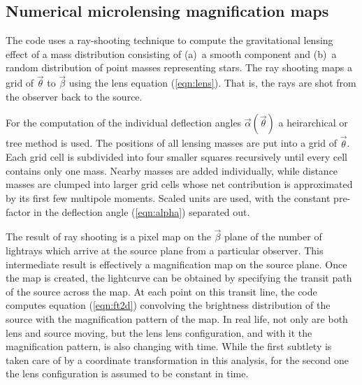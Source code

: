 \documentclass[usenatbib]{mn2e}
\begin{document}
\subsection{Numerical microlensing magnification maps}

The code uses a ray-shooting technique to compute the gravitational
lensing effect of a mass distribution consisting of (a)~a smooth
component and (b)~a random distribution of point masses representing
stars.  The ray shooting maps a grid of $\vec\theta$ to $\vec\beta$
using the lens equation (\ref{eqn:lens}).  That is, the rays are shot
from the observer back to the source.

For the computation of the individual deflection angles
$\vec\alpha(\vec\theta)$ a heirarchical or tree method is used.  The
positions of all lensing masses are put into a grid of $\vec\theta$.
Each grid cell is subdivided into four smaller squares recursively
until every cell contains only one mass.  Nearby masses are added
individually, while distance masses are clumped into larger grid cells
whose net contribution is approximated by its first few multipole
moments.  Scaled units are used, with the constant pre-factor in the
deflection angle (\ref{eqn:alpha}) separated out.

The result of ray shooting is a pixel map on the $\vec\beta$ plane of
the number of lightrays which arrive at the source plane from a
particular observer.  This intermediate result is effectively a
magnification map on the source plane.  Once the map is created, the
lightcurve can be obtained by specifying the transit path of the
source across the map.  At each point on this transit line, the code
computes equation (\ref{eqn:ft2d}) convolving the brightness
distribution of the source with the magnification pattern of the map.
In real life, not only are both lens and source moving, but the lens
lens configuration, and with it the magnification pattern, is also
changing with time.  While the first subtlety is taken care of by a
coordinate transformation in this analysis, for the second one the
lens configuration is assumed to be constant in time.
\end{document}
